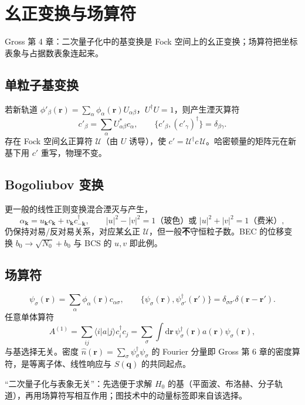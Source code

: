 \section{幺正变换与场算符}

Gross 第 4 章：二次量子化中的基变换是 Fock 空间上的幺正变换；场算符把坐标表象与占据数表象连起来。

\subsection{单粒子基变换}

若新轨道 $\phi'_\beta(\mathbf{r})=\sum_\alpha\phi_\alpha(\mathbf{r})U_{\alpha\beta}$，$U^\dagger U=1$，则产生湮灭算符
\begin{equation}
  c'_\beta=\sum_\alpha U_{\alpha\beta}^* c_\alpha,
  \qquad
  \{c'_\beta,(c'_\gamma)^\dagger\}=\delta_{\beta\gamma}.
\end{equation}
存在 Fock 空间幺正算符 $\mathcal{U}$（由 $U$ 诱导），使 $c'=\mathcal{U}^\dagger c\,\mathcal{U}$。哈密顿量的矩阵元在新基下用 $c'$ 重写，物理不变。

\subsection{Bogoliubov 变换}

更一般的线性正则变换混合湮灭与产生，
\begin{equation}
  \alpha_{\mathbf{k}}
  =u_{\mathbf{k}}c_{\mathbf{k}}+v_{\mathbf{k}}c_{-\mathbf{k}}^\dagger,
  \qquad
  |u|^2-|v|^2=1
  \text{（玻色）或 }|u|^2+|v|^2=1\text{（费米）},
\end{equation}
仍保持对易/反对易关系，对应某幺正 $\mathcal{U}$，但一般\textbf{不}守恒粒子数。BEC 的位移变换 $b_0\to\sqrt{N_0}+b_0$ 与 BCS 的 $u,v$ 即此例。

\subsection{场算符}

\begin{equation}
  \psi_\sigma(\mathbf{r})=\sum_\alpha\phi_\alpha(\mathbf{r})c_{\alpha\sigma},
  \qquad
  \{\psi_\sigma(\mathbf{r}),\psi_{\sigma'}^\dagger(\mathbf{r}')\}=\delta_{\sigma\sigma'}\delta(\mathbf{r}-\mathbf{r}').
\end{equation}
任意单体算符
\begin{equation}
  A^{(1)}
  =\sum_{ij}
  \langle i|a|j\rangle
  c_i^\dagger c_j
  =\sum_\sigma\int\mathrm{d}\mathbf{r}\,
  \psi_\sigma^\dagger(\mathbf{r})
  a(\mathbf{r})
  \psi_\sigma(\mathbf{r}),
\end{equation}
与基选择无关。密度 $\hat n(\mathbf{r})=\sum_\sigma\psi_\sigma^\dagger\psi_\sigma$ 的 Fourier 分量即 Gross 第 6 章的密度算符，是等离子体、线性响应与 $S(\mathbf{q})$ 的共同起点。

\begin{note}
“二次量子化与表象无关”：先选便于求解 $H_0$ 的基（平面波、布洛赫、分子轨道），再用场算符写相互作用；图技术中的动量标签即来自该选择。
\end{note}

